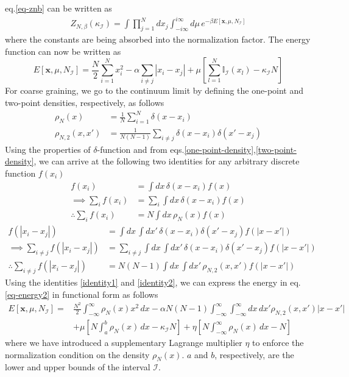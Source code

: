 \documentclass[11pt]{article}
\begin{document}
eq.\eqref{eq-znb} can be written as
\begin{align*}
Z_{N,\beta}(\kappa_\mathcal{I}) = \int\prod_{j=1}^Ndx_j\int_{-i\infty}^{i\infty}d\mu\, e^{-\beta E[\textbf{x},\mu,N_\mathcal{I}]}
\end{align*}
where the constants are being absorbed into the normalization factor. The energy function can now be written as
\begin{equation}
E[\textbf{x},\mu,N_\mathcal{I}] = \frac{N}{2}\sum_{i=1}^Nx_i^2- \alpha \sum_{i\neq j}|x_i-x_j|+\mu\left[\sum_{l=1}^N\mathbb{I}_\mathcal{I}(x_l)-\kappa_\mathcal{I}N\right]\label{eq-energy2}
\end{equation}
For coarse graining, we go to the continuum limit by defining the one-point and two-point densities, respectively, as follows
\begin{align}
\rho_N(x) &= \frac{1}{N}\sum_{i=1}^N\delta(x-x_i)\label{one-point-density}\\
\rho_{N,2}(x,x')&=\frac{1}{N(N-1)}\sum_{i\neq j}\delta(x-x_i)\delta(x'-x_j)\label{two-point-density}
\end{align} 
Using the properties of $\delta$-function and from eqs.\eqref{one-point-density},\eqref{two-point-density}, we can arrive at the following two identities for any arbitrary discrete function $f(x_i)$
\begin{align}
f(x_i) &= \int dx\,\delta(x-x_i)f(x)\nonumber\\
\implies \sum_i f(x_i) &= \sum_i\int dx\,\delta(x-x_i)f(x)\nonumber\\
\therefore \sum_i f(x_i) &=N\int dx\,\rho_N(x)f(x)\label{identity1}
\end{align}
\begin{align}
f(|x_i-x_j|) &= \int dx\,\int dx'\, \delta(x-x_i)\delta(x'-x_j)f(|x-x'|)\nonumber\\
\implies \sum_{i\neq j}f(|x_i-x_j|)&=\sum_{i\neq j}\int dx\,\int dx'\, \delta(x-x_i)\delta(x'-x_j)f(|x-x'|)\nonumber\\
\therefore \sum_{i\neq j}f(|x_i-x_j|)&=N(N-1)\int dx\,\int dx'\, \rho_{N,2}(x,x')f(|x-x'|)\label{identity2}
\end{align}
Using the identities \eqref{identity1} and \eqref{identity2}, we can express the energy in eq.\eqref{eq-energy2} in functional form as follows
\begin{align}
E[\textbf{x},\mu,N_\mathcal{I}] = & \frac{N^2}{2}\int_{-\infty}^\infty\rho_N(x)x^2\,dx-\alpha N(N-1)\int_{-\infty}^\infty \int_{-\infty}^\infty dx\, dx'\rho_{N,2}(x,x')|x-x'|\nonumber\\
& +\mu\left[N\int_a^b\rho_N(x)\,dx - \kappa_\mathcal{I}N\right]+\eta\left[N\int_{-\infty}^\infty\rho_N(x)\, dx-N\right]
\end{align}
where we have introduced a supplementary Lagrange multiplier $\eta$ to enforce the normalization condition on the density $\rho_N(x)$. $a$ and $b$, respectively, are the lower and upper bounds of the interval $\mathcal{I}$.
\end{document}

